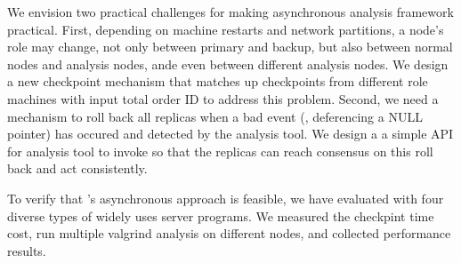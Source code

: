 We envision two practical challenges for making asynchronous analysis framework 
practical. First, depending on machine restarts and network partitions, a 
node's role may change, not only between primary and backup, but also between 
normal nodes and analysis nodes, ande even between different analysis nodes. We 
design a new checkpoint mechanism that matches up checkpoints from different 
role machines with input total order ID to address this problem. Second, we 
need a mechanism to roll back all replicas when a bad event (\eg, deferencing 
a NULL pointer) has occured and detected by the analysis tool. We design a a 
simple API for analysis tool to invoke so that the replicas can reach consensus 
on this roll back and act consistently.

To verify that \xxx's asynchronous approach is feasible, we have evaluated 
\xxx with four diverse types of widely uses server programs. We measured the 
checkpint time cost, run multiple valgrind analysis on different nodes, and 
collected performance results.



